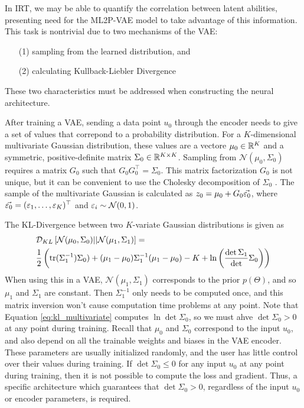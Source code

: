 In IRT, we may be able to quantify the correlation between latent abilities, presenting need for the ML2P-VAE model to take advantage of this information. This task is nontrivial due to two mechanisms of the VAE:
\begin{itemize}
  \item[(1)] sampling from the learned distribution, and
  \item[(2)] calculating Kullback-Liebler Divergence
\end{itemize}
These two characteristics must be addressed when constructing the neural architecture.

After training a VAE, sending a data point $u_0$ through the encoder needs to give a set of values that correpond to a probability distribution. For a $K$-dimensional multivariate Gaussian distribution, these values are a vectore $\mu_0 \in \mathbb{R}^K$ and a symmetric, positive-definite matrix $\Sigma_0 \in \mathbb{R}^{K\times K}$. Sampling from $\mathcal{N}(\mu_0, \Sigma_0)$ requires a matrix $G_0$ such that $G_0 G_0^\top = \Sigma_0$. This matrix factorization $G_0$ is not unique, but it can be convenient to use the Cholesky decomposition of $\Sigma_0$ \cite{atkinson}. The sample of the multivariate Gaussian is calculated as $z_0 = \mu_0 + G_0 \vec{\varepsilon_0}$, where $\vec{\varepsilon_0} = (\varepsilon_1, \ldots, \varepsilon_K)^\top$ and $\varepsilon_i \sim \mathcal{N}(0,1)$. 

The KL-Divergence between two $K$-variate Gaussian distributions is given as
\begin{equation}
\begin{split}
  &\mathcal{D}_{KL}\left[\mathcal{N}(\mu_0, \Sigma_0) || \mathcal{N}(\mu_1, \Sigma_1) \right] = \\
&\frac{1}{2} \left( \text{tr}(\Sigma_1^{-1}) \Sigma_0) + (\mu_1 - \mu_0) \Sigma_1^{-1} (\mu_1 - \mu_0) - K + \ln\left( \frac{\det \Sigma_1}\det \Sigma_0 \right) \right)
  \label{eq:kl_multivariate}
\end{split}
\end{equation}
When using this in a VAE, $\mathcal{N}(\mu_1, \Sigma_1)$ corresponds to the prior $p(\Theta)$, and so $\mu_1$ and $\Sigma_1$ are constant. Then $\Sigma_1^{-1}$ only needs to be computed once, and this matrix inversion won't cause computation time problems at any point. Note that Equation \ref{eq:kl_multivariate} computes $\ln \det \Sigma_0$, so we must ahve $\det \Sigma_0 > 0$ at any point during training. Recall that $\mu_0$ and $\Sigma_0$ correspond to the input $u_0$, and also depend on all the trainable weights and biases in the VAE encoder. These parameters are usually initialized randomly, and the user has little control over their values during training. If $\det \Sigma_0 \leq 0$ for any input $u_0$ at any point during training, then it is not possible to compute the loss and gradient. Thus, a specific architecture which guarantees that $\det \Sigma_0 > 0$, regardless of the input $u_0$ or encoder parameters, is required.

